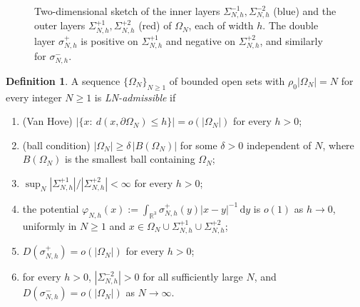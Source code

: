 \documentclass[final,reqno]{amsart}
\theoremstyle{remark}
\theoremstyle{definition}
\newtheorem{definition}[theorem]{Definition}
\renewcommand{\le}{\leqslant}
\renewcommand{\ge}{\geqslant}
\newcommand{\RR}{\mathbb{R}}
\begin{document}
\begin{figure}[ht]
\centering
{}
\caption{Two-dimensional sketch of the inner layers $\Sigma^{-1}_{N,h},\Sigma^{-2}_{N,h}$ (blue) and the outer layers $\Sigma^{+1}_{N,h},\Sigma^{+2}_{N,h}$ (red) of $\Omega_N$, each of width $h$. The double layer $\sigma^+_{N,h}$ is positive on $\Sigma^{+1}_{N,h}$ and negative on $\Sigma^{+2}_{N,h}$, and similarly for $\sigma^-_{N,h}$.}
\label{fig:LN_layers}
\end{figure}

\begin{definition}\label{def:LN_domains}
A sequence $\{\Omega_N\}_{N\ge1}$ of bounded open sets with $\rho_0|\Omega_N|=N$ for every integer $N\ge1$ is \emph{LN-admissible} if
\begin{enumerate}
\item[(A)] (Van Hove) $\big|\{x:\ d(x,\partial\Omega_N)\le h\}\big|=o(|\Omega_N|)$ for every $h>0$;
\item[(B)] (ball condition) $|\Omega_N|\ge\delta\,|B(\Omega_N)|$ for some $\delta>0$ independent of $N$, where $B(\Omega_N)$ is the smallest ball containing $\Omega_N$;
\item[(i)] $\sup_N|\Sigma^{+1}_{N,h}|/|\Sigma^{+2}_{N,h}|<\infty$ for every $h>0$;
\item[(ii)] the potential $\varphi_{N,h}(x):=\int_{\RR^3}\sigma^+_{N,h}(y)|x-y|^{-1}\,\mathrm dy$ is $o(1)$
as $h\to0$, uniformly in $N\ge1$ and $x\in\Omega_N\cup\Sigma^{+1}_{N,h}\cup\Sigma^{+2}_{N,h}$;
\item[(iii)] $D(\sigma^+_{N,h})=o(|\Omega_N|)$ for every $h>0$;
\item[(iv)] for every $h>0$, $|\Sigma^{-2}_{N,h}|>0$ for all sufficiently large $N$, and $D(\sigma^-_{N,h})=o(|\Omega_N|)$ as $N\to\infty$.
\end{enumerate}
\end{definition}
\end{document}
